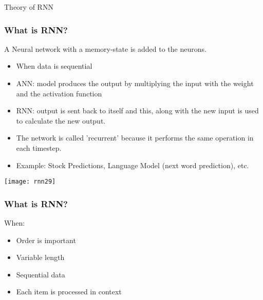 \begin{frame}
  \begin{center}
    {\Large Theory of RNN}
  \end{center}
\end{frame}

\begin{frame}[fragile] \frametitle{What is RNN?}
A Neural network with a memory-state is added to the neurons. 
\begin{itemize}
\item When data is sequential
\item ANN: model produces the output by multiplying the input with the weight and the activation function
\item RNN: output is sent back to itself and this, along with the new input is used to calculate the new output.
\item The network is called 'recurrent' because it performs the same operation in each timestep.
\item Example: Stock Predictions, Language Model (next word prediction), etc.
\end{itemize}


\begin{center}
\texttt{[image: rnn29]}
\end{center}
\end{frame}


\begin{frame}[fragile] \frametitle{What is RNN?}
When:
\begin{itemize}
\item Order is important
\item Variable length
\item Sequential data
\item Each item is processed in context
\end{itemize}

\end{frame}


